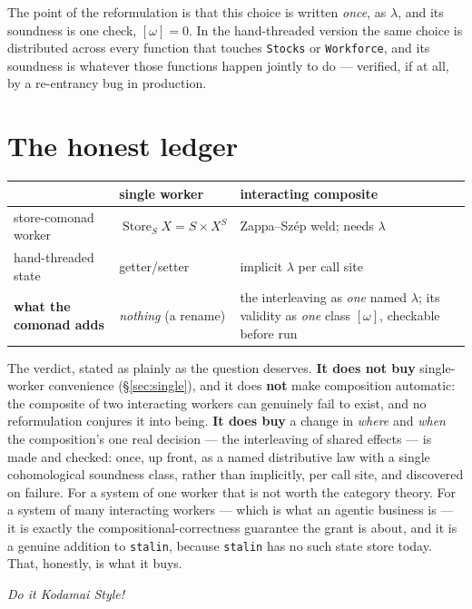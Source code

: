 \documentclass[11pt]{article}
\DeclareMathOperator{\Store}{Store}
\theoremstyle{plain}
\theoremstyle{definition}
\begin{document}
The point of the reformulation is that this choice is written \emph{once}, as $\lambda$, and its
soundness is one check, $[\omega]=0$. In the hand-threaded version the same choice is distributed
across every function that touches \texttt{Stocks} or \texttt{Workforce}, and its soundness is
whatever those functions happen jointly to do --- verified, if at all, by a re-entrancy bug in
production.

\section{The honest ledger}\label{sec:ledger}

\begin{honestbox}
\begin{center}\small
\begin{tabular}{@{}p{}p{}p{}@{}}
\toprule
 & \textbf{single worker} & \textbf{interacting composite} \\
\midrule
store-comonad worker & $\Store_S X=S\times X^S$ & Zappa--Sz\'ep weld; needs $\lambda$ \\
hand-threaded state & getter/setter & implicit $\lambda$ per call site \\
\textbf{what the comonad adds} & \emph{nothing} (a rename) & the interleaving as \emph{one} named $\lambda$; its validity as \emph{one} class $[\omega]$, checkable before run \\
\bottomrule
\end{tabular}
\end{center}
\end{honestbox}

\noindent The verdict, stated as plainly as the question deserves. \textbf{It does not buy}
single-worker convenience (\S\ref{sec:single}), and it does \textbf{not} make composition automatic:
the composite of two interacting workers can genuinely fail to exist, and no reformulation conjures
it into being. \textbf{It does buy} a change in \emph{where} and \emph{when} the composition's one
real decision --- the interleaving of shared effects --- is made and checked: once, up front, as a
named distributive law with a single cohomological soundness class, rather than implicitly, per call
site, and discovered on failure. For a system of one worker that is not worth the category theory. For
a system of many interacting workers --- which is what an agentic business is --- it is exactly the
compositional-correctness guarantee the grant is about, and it is a genuine addition to \texttt{stalin},
because \texttt{stalin} has no such state store today. That, honestly, is what it buys.

\begin{center}\itshape Do it Kodamai Style!\end{center}
\end{document}
